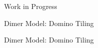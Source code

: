 \begin{block}{Work in Progress}

\begin{alertblock}{Dimer Model: Domino Tiling}
\end{alertblock}

\begin{alertblock}{Dimer Model: Domino Tiling}
\end{alertblock}

\end{block}


